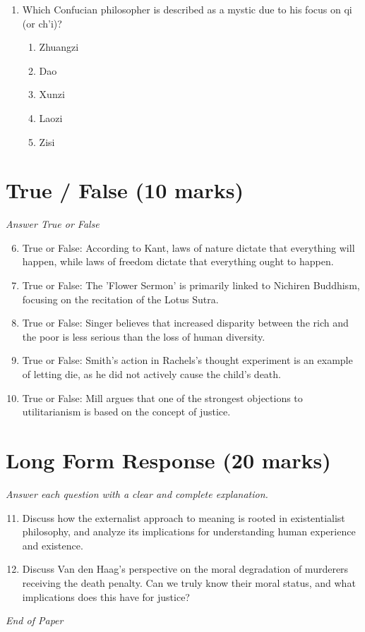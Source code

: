 \documentclass[12pt]{article}
\begin{document}
\begin{enumerate}[label=\arabic*.]
\begin{enumerate}[label=(\alph*)]
    \item loving God.
    \item pleasure
    \item achieving personal success
\end{enumerate}
\item Which Confucian philosopher is described as a mystic due to his focus on qi (or ch'i)?
\begin{enumerate}[label=(\alph*)]
    \item Zhuangzi
    \item Dao
    \item Xunzi
    \item Laozi
    \item Zisi
\end{enumerate}
\end{enumerate}

\section*{True / False (10 marks)}
\textit{Answer True or False}
\begin{enumerate}[label=\arabic*.]
\setcounter{enumi}{5}
\item True or False: According to Kant, laws of nature dictate that everything will happen, while laws of freedom dictate that everything ought to happen.
\item True or False: The 'Flower Sermon' is primarily linked to Nichiren Buddhism, focusing on the recitation of the Lotus Sutra.
\item True or False: Singer believes that increased disparity between the rich and the poor is less serious than the loss of human diversity.
\item True or False: Smith's action in Rachels's thought experiment is an example of letting die, as he did not actively cause the child's death.
\item True or False: Mill argues that one of the strongest objections to utilitarianism is based on the concept of justice.
\end{enumerate}

\section*{Long Form Response (20 marks)}
\textit{Answer each question with a clear and complete explanation.}
\begin{enumerate}[label=\arabic*.]
\setcounter{enumi}{10}
\item Discuss how the externalist approach to meaning is rooted in existentialist philosophy, and analyze its implications for understanding human experience and existence.
\item Discuss Van den Haag's perspective on the moral degradation of murderers receiving the death penalty. Can we truly know their moral status, and what implications does this have for justice?
\end{enumerate}

\vfill
\noindent\textit{End of Paper}
\end{document}
